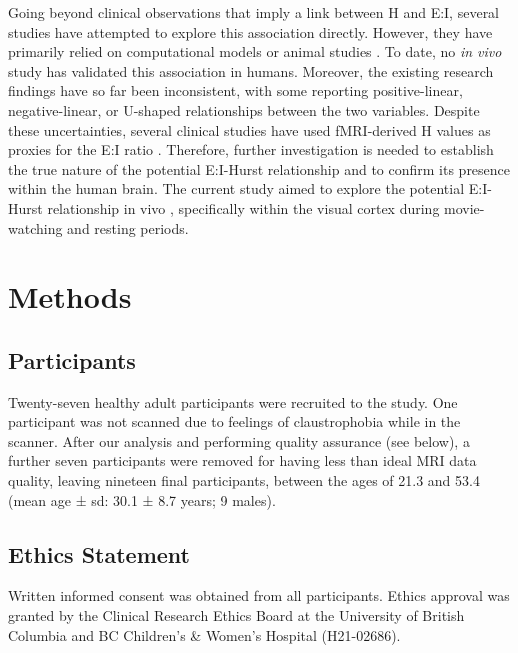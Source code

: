 \documentclass[
true
]{sn-jnl}
\begin{document}
Going beyond clinical observations that imply a link between H and E:I,
several studies have attempted to explore this association directly.
However, they have primarily relied on computational models or animal
studies
\citep{liangExcitationInhibitionBalance2024, poilCriticalStateDynamicsAvalanches2012, lombardiBalanceExcitationInhibition2017, baumgartenCriticalExcitationinhibitionBalance2019, bruiningMeasurementExcitationinhibitionRatio2020, trakoshisIntrinsicExcitationinhibitionImbalance, gaoInferringSynapticExcitation2017}.
To date, no \emph{in vivo} study has validated this association in
humans. Moreover, the existing research findings have so far been
inconsistent, with some reporting positive-linear, negative-linear, or
U-shaped relationships between the two variables. Despite these
uncertainties, several clinical studies have used fMRI-derived H values
as proxies for the E:I ratio
\citep{linkeAlteredDevelopmentHurst2024, xiePharmacoresistantTemporalLobe2024, uscatescuUsingExcitationInhibition2023}.
Therefore, further investigation is needed to establish the true nature
of the potential E:I-Hurst relationship and to confirm its presence
within the human brain. The current study aimed to explore the potential
E:I-Hurst relationship in vivo , specifically within the visual cortex
during movie-watching and resting periods.

\section{Methods}\label{methods}

\subsection{Participants}\label{participants}

Twenty-seven healthy adult participants were recruited to the study. One
participant was not scanned due to feelings of claustrophobia while in
the scanner. After our analysis and performing quality assurance (see
below), a further seven participants were removed for having less than
ideal MRI data quality, leaving nineteen final participants, between the
ages of 21.3 and 53.4 (mean age ± sd: 30.1 ± 8.7 years; 9 males).

\subsection{Ethics Statement}\label{ethics-statement}

Written informed consent was obtained from all participants. Ethics
approval was granted by the Clinical Research Ethics Board at the
University of British Columbia and BC Children's \& Women's Hospital
(H21-02686).
\end{document}
